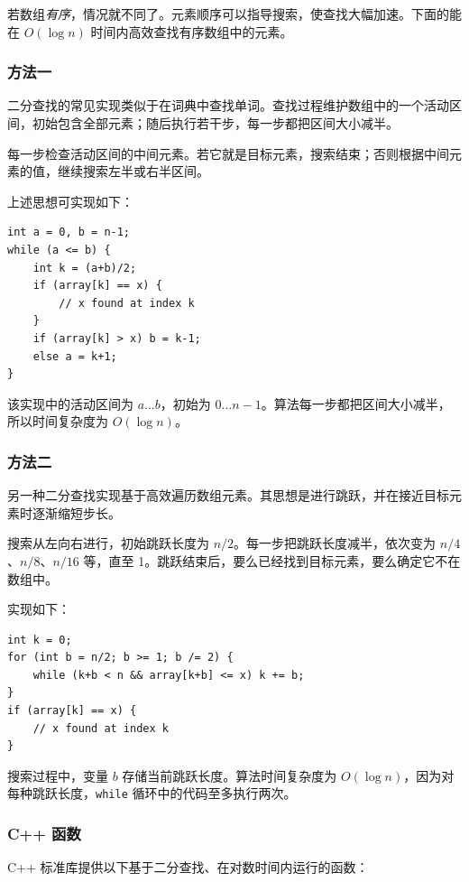 若数组\emph{有序}，情况就不同了。元素顺序可以指导搜索，使查找大幅加速。下面的能在 $O(\log n)$ 时间内高效查找有序数组中的元素。

\subsubsection{方法一}

二分查找的常见实现类似于在词典中查找单词。查找过程维护数组中的一个活动区间，初始包含全部元素；随后执行若干步，每一步都把区间大小减半。

每一步检查活动区间的中间元素。若它就是目标元素，搜索结束；否则根据中间元素的值，继续搜索左半或右半区间。

上述思想可实现如下：
\begin{lstlisting}
int a = 0, b = n-1;
while (a <= b) {
    int k = (a+b)/2;
    if (array[k] == x) {
        // x found at index k
    }
    if (array[k] > x) b = k-1;
    else a = k+1;
}
\end{lstlisting}

该实现中的活动区间为 $a \ldots b$，初始为 $0 \ldots n-1$。算法每一步都把区间大小减半，所以时间复杂度为 $O(\log n)$。

\subsubsection{方法二}

另一种二分查找实现基于高效遍历数组元素。其思想是进行跳跃，并在接近目标元素时逐渐缩短步长。

搜索从左向右进行，初始跳跃长度为 $n/2$。每一步把跳跃长度减半，依次变为 $n/4$、$n/8$、$n/16$ 等，直至 1。跳跃结束后，要么已经找到目标元素，要么确定它不在数组中。

实现如下：
\begin{lstlisting}
int k = 0;
for (int b = n/2; b >= 1; b /= 2) {
    while (k+b < n && array[k+b] <= x) k += b;
}
if (array[k] == x) {
    // x found at index k
}
\end{lstlisting}

搜索过程中，变量 $b$ 存储当前跳跃长度。算法时间复杂度为 $O(\log n)$，因为对每种跳跃长度，\texttt{while} 循环中的代码至多执行两次。

\subsubsection{C++ 函数}

C++ 标准库提供以下基于二分查找、在对数时间内运行的函数：

